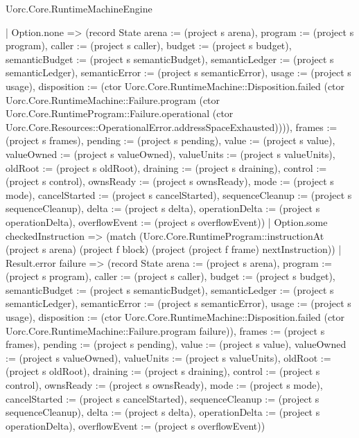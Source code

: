 \begin{lexlean}{Uorc.Core.RuntimeMachineEngine}
\begin{semanticmodule}
{        | Option.none => (record State {arena := (project s arena), program := (project s program), caller := (project s caller), budget := (project s budget), semanticBudget := (project s semanticBudget), semanticLedger := (project s semanticLedger), semanticError := (project s semanticError), usage := (project s usage), disposition := (ctor Uorc.Core.RuntimeMachine::Disposition.failed (ctor Uorc.Core.RuntimeMachine::Failure.program (ctor Uorc.Core.RuntimeProgram::Failure.operational (ctor Uorc.Core.Resources::OperationalError.addressSpaceExhausted)))), frames := (project s frames), pending := (project s pending), value := (project s value), valueOwned := (project s valueOwned), valueUnits := (project s valueUnits), oldRoot := (project s oldRoot), draining := (project s draining), control := (project s control), ownsReady := (project s ownsReady), mode := (project s mode), cancelStarted := (project s cancelStarted), sequenceCleanup := (project s sequenceCleanup), delta := (project s delta), operationDelta := (project s operationDelta), overflowEvent := (project s overflowEvent)})
        | Option.some checkedInstruction => (match (Uorc.Core.RuntimeProgram::instructionAt (project s arena) (project f block) (project (project f frame) nextInstruction))
          | Result.error failure => (record State {arena := (project s arena), program := (project s program), caller := (project s caller), budget := (project s budget), semanticBudget := (project s semanticBudget), semanticLedger := (project s semanticLedger), semanticError := (project s semanticError), usage := (project s usage), disposition := (ctor Uorc.Core.RuntimeMachine::Disposition.failed (ctor Uorc.Core.RuntimeMachine::Failure.program failure)), frames := (project s frames), pending := (project s pending), value := (project s value), valueOwned := (project s valueOwned), valueUnits := (project s valueUnits), oldRoot := (project s oldRoot), draining := (project s draining), control := (project s control), ownsReady := (project s ownsReady), mode := (project s mode), cancelStarted := (project s cancelStarted), sequenceCleanup := (project s sequenceCleanup), delta := (project s delta), operationDelta := (project s operationDelta), overflowEvent := (project s overflowEvent)})
}
\end{semanticmodule}
\end{lexlean}
